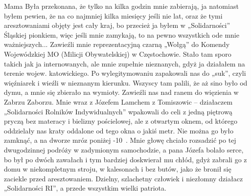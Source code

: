 Mama Była przekonana, że tylko na kilka godzin mnie zabierają, ja natomiast byłem pewien, że na co najmniej kilka miesięcy jeśli nie lat, oraz że tymi aresztowaniami objęty jest cały kraj, bo przecież ja byłem w „Solidarności” Śląskiej pionkiem, więc jeśli mnie zamykają, to na pewno wszystkich ode mnie ważniejszych... Zawieźli mnie reprezentacyjną czarną „Wołgą”  do Komendy Wojewódzkiej MO (Milicji Obywatelskiej) w Częstochowie. Stało tam sporo takich jak ja internowanych, ale mnie zupełnie nieznanych, gdyż ja działałem na terenie wojew. katowickiego. Po wylegitymowaniu zapakowali nas do „suk”, czyli więźniarek i wieźli w nieznanym kierunku. Wszyscy tam palili, że aż sino było od dymu, a mnie się zbierało na wymioty. Zawieźli nas nad ranem do więzienia w Zabrzu Zaborzu. Mnie wraz z Józefem Lamchem z Tomiszowic – działaczem „Solidarności Rolników Indywidualnych” wpakowali do celi z jedną piętrową pryczą bez materacy i bielizny pościelowej, ale z otwartym oknem, od którego oddzielały nas kraty oddalone od tego okna o jakiś metr. Nie można go było zamknąć, a na dworze mróz poniżej -10~\textcelsius. Mnie głowę chciało rozsadzić po tej dwugodzinnej podróży w zadymionym samochodzie, a pana Józefa bolało serce, bo był po dwóch zawałach i tym bardziej doskwierał mu chłód, gdyż zabrali go z domu w niekompletnym stroju, w kalesonach i bez butów, jako że bronił się zaciekle przed aresztowaniem. Dzielny, szlachetny człowiek i niezłomny działacz „Solidarności RI”, a przede wszystkim wielki patriota.

